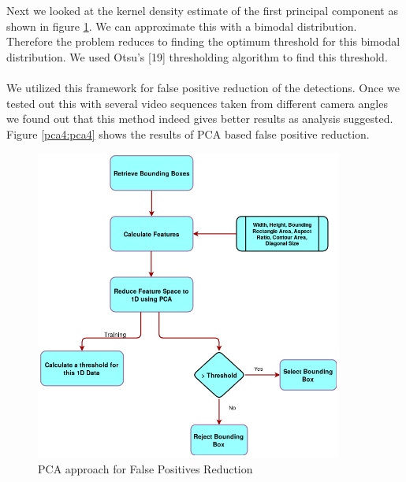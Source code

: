 \documentclass[12pt,a4paper]{report}
\begin{document}
Next we looked at the kernel density estimate of the first principal component as shown in figure \ref{pca3}. We can approximate this with a bimodal distribution. Therefore the problem reduces to finding the optimum threshold for this bimodal distribution. We used Otsu's [19] thresholding algorithm to find this threshold.
\\\\
We utilized this framework for false positive reduction of the detections. Once we tested out this with several video sequences taken from different camera angles we found out that this method indeed gives better results as analysis suggested. Figure \ref{pca4:pca4} shows the results of PCA based false positive reduction.\\
\begin{figure}[H]
\includegraphics[width=0.9\textwidth]{pca_flow.png}
\centering
\caption{PCA approach for False Positives Reduction}
\label{pca3}
\end{figure}
\end{document}
